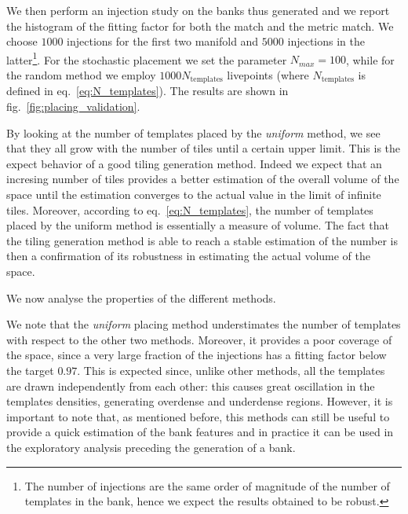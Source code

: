 \documentclass[twocolumn,showpacs,preprintnumbers,nofootinbib,prd,
superscriptaddress,10pt]{revtex4-1}
\begin{document}
We then perform an injection study on the banks thus generated and we report the histogram of the fitting factor for both the match and the metric match. We choose $1000$ injections for the first two manifold and $5000$ injections in the latter\footnote{
The number of injections are the same order of magnitude of the number of templates in the bank, hence we expect the results obtained to be robust.}.
For the stochastic placement we set the parameter $N_{max} = 100$, while for the random method we employ $1000 N_{\text{templates}}$ livepoints (where $N_{\text{templates}}$ is defined in eq.~\eqref{eq:N_templates}).
The results are shown in fig.~\ref{fig:placing_validation}.

By looking at the number of templates placed by the {\it uniform} method, we see that they all grow with the number of tiles until a certain upper limit. This is the expect behavior of a good tiling generation method. Indeed we expect that an incresing number of tiles provides a better estimation of the overall volume of the space until the estimation converges to the actual value in the limit of infinite tiles. Moreover, according to eq.~\eqref{eq:N_templates}, the number of templates placed by the uniform method is essentially a measure of volume.
The fact that the tiling generation method is able to reach a stable estimation of the number is then a confirmation of its robustness in estimating the actual volume of the space.

We now analyse the properties of the different methods.

We note that the {\it uniform} placing method understimates the number of templates with respect to the other two methods. Moreover, it provides a poor coverage of the space, since a very large fraction of the injections has a fitting factor below the target $0.97$. This is expected since, unlike other methods, all the templates are drawn independently from each other: this causes great oscillation in the templates densities, generating overdense and underdense regions.
However, it is important to note that, as mentioned before, this methods can still be useful to provide a quick estimation of the bank features and in practice it can be used in the exploratory analysis preceding the generation of a bank.
\end{document}
